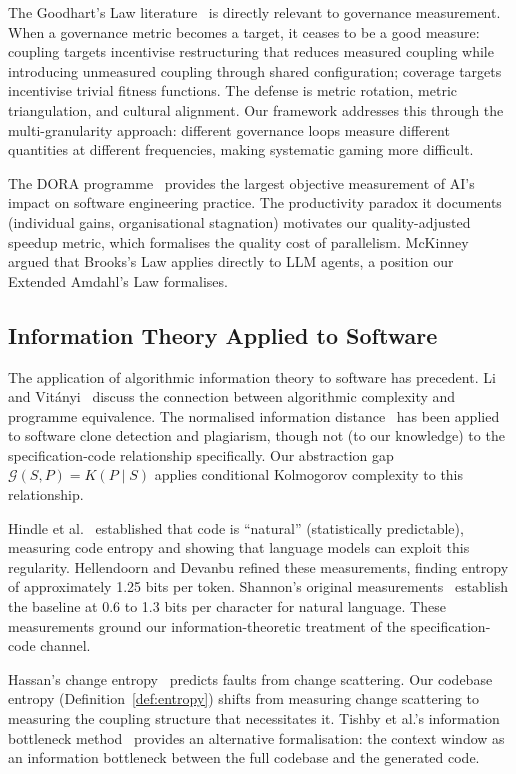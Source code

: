 The Goodhart's Law literature~\citep{goodhart1975, manheim2019goodhart} is directly relevant to governance measurement. When a governance metric becomes a target, it ceases to be a good measure: coupling targets incentivise restructuring that reduces measured coupling while introducing unmeasured coupling through shared configuration; coverage targets incentivise trivial fitness functions. The defense is metric rotation, metric triangulation, and cultural alignment. Our framework addresses this through the multi-granularity approach: different governance loops measure different quantities at different frequencies, making systematic gaming more difficult.

The DORA programme~\citep{dora2025} provides the largest objective measurement of AI's impact on software engineering practice. The productivity paradox it documents (individual gains, organisational stagnation) motivates our quality-adjusted speedup metric, which formalises the quality cost of parallelism. McKinney~\citep{McKinney2026} argued that Brooks's Law applies directly to LLM agents, a position our Extended Amdahl's Law formalises.


\subsection{Information Theory Applied to Software}

The application of algorithmic information theory to software has precedent. Li and Vit\'{a}nyi~\citep{li2019introduction} discuss the connection between algorithmic complexity and programme equivalence. The normalised information distance~\citep{li2004similarity} has been applied to software clone detection and plagiarism, though not (to our knowledge) to the specification-code relationship specifically. Our abstraction gap $\mathcal{G}(S, P) = K(P \mid S)$ applies conditional Kolmogorov complexity to this relationship.

Hindle et al.~\citep{hindle2012naturalness} established that code is ``natural'' (statistically predictable), measuring code entropy and showing that language models can exploit this regularity. Hellendoorn and Devanbu refined these measurements, finding entropy of approximately 1.25 bits per token. Shannon's original measurements~\citep{shannon1948} establish the baseline at 0.6 to 1.3 bits per character for natural language. These measurements ground our information-theoretic treatment of the specification-code channel.

Hassan's change entropy~\citep{hassan2009} predicts faults from change scattering. Our codebase entropy (Definition~\ref{def:entropy}) shifts from measuring change scattering to measuring the coupling structure that necessitates it. Tishby et al.'s information bottleneck method~\citep{tishby2000information} provides an alternative formalisation: the context window as an information bottleneck between the full codebase and the generated code.

